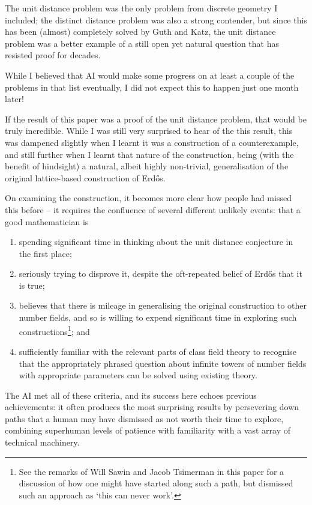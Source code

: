 \documentclass[11pt,reqno]{amsart}
\numberwithin{equation}{section}
\theoremstyle{definition}
\theoremstyle{remark}
\begin{document}
The unit distance problem was the only problem from discrete geometry I included; the distinct distance problem was also a strong contender, but since this has been (almost) completely solved by Guth and Katz, the unit distance problem was a better example of a still open yet natural question that has resisted proof for decades.

While I believed that AI would make some progress on at least a couple of the problems in that list eventually, I did not expect this to happen just one month later!

If the result of this paper was a proof of the unit distance problem, that would be truly incredible. While I was still very surprised to hear of the this result, this was dampened slightly when I learnt it was a construction of a counterexample, and still further when I learnt that nature of the construction, being (with the benefit of hindsight) a natural, albeit highly non-trivial, generalisation of the original lattice-based construction of Erd\H{o}s. 

On examining the construction, it becomes more clear how people had missed this before --  it requires the confluence of several different unlikely events: that a good mathematician is
\begin{enumerate}
\item spending significant time in thinking about the unit distance conjecture in the first place;
\item seriously trying to disprove it, despite the oft-repeated belief of Erd\H{o}s that it is true;
\item believes that there is mileage in generalising the original construction to other number fields, and so is willing to expend significant time in exploring such constructions\footnote{See the remarks of Will Sawin and Jacob Tsimerman in this paper for a discussion of how one might have started along such a path, but dismissed such an approach as `this can never work'.}; and
\item sufficiently familiar with the relevant parts of class field theory to recognise that the appropriately phrased question about infinite towers of number fields with appropriate parameters can be solved using existing theory.
\end{enumerate}
The AI met all of these criteria, and its success here echoes previous achievements: it often produces the most surprising results by persevering down paths that a human may have dismissed as not worth their time to explore, combining superhuman levels of patience with familiarity with a vast array of technical machinery.
\end{document}
